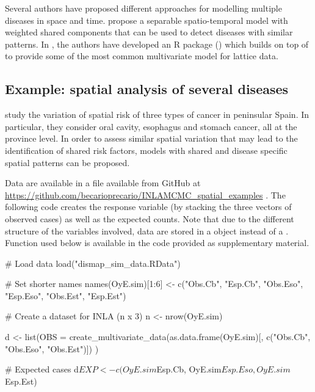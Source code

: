 \medskip 
Several authors \citep[see, for example,][and the references therein]{MartinezBeneito:2013} have proposed different approaches for modelling multiple diseases in space and time. \citet{GomezRubioetal:2019} propose a separable spatio-temporal model with weighted shared components that can be used to detect diseases with similar patterns. In \citet{INLAMSM}, the authors have developed an R package () which builds on top of  to provide some of the most common multivariate model for lattice data.


\subsection{Example: spatial analysis of several diseases}

\cite{GomezRubioPalmiPerales:2018} study the variation of spatial risk of three types of cancer in peninsular Spain. In particular, they consider oral cavity, esophagus and stomach cancer, all at the province level. In order to assess similar spatial variation that may lead to the identification of shared risk factors, models with shared and disease specific spatial patterns can be proposed.

Data are available in a  file available from GitHub at \url{https://github.com/becarioprecario/INLAMCMC_spatial_examples} \cite[see][for details]{GomezRubioPalmiPerales:2018}. The following code creates the response variable (by stacking the three vectors of observed cases) as well as the expected counts. Note that due to the different structure of the variables involved, data are stored in a  object instead of a . Function  used below is available in the code provided as supplementary material. 

\begin{example*}
# Load data
load("dismap_sim_data.RData")

# Set shorter names
names(OyE.sim)[1:6] <- c("Obs.Cb", "Esp.Cb", "Obs.Eso", "Esp.Eso", "Obs.Est", "Esp.Est")

# Create a dataset for INLA (n x 3)
n <- nrow(OyE.sim)

d <- list(OBS = 
  create_multivariate_data(as.data.frame(OyE.sim)[, c("Obs.Cb", "Obs.Eso", "Obs.Est")])
)


# Expected cases
d$EXP <- c(OyE.sim$Esp.Cb, OyE.sim$Esp.Eso, OyE.sim$Esp.Est)
\end{example*}



